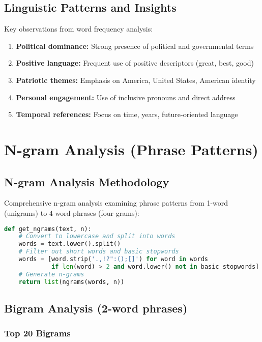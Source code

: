 \documentclass[12pt,a4paper]{article}
\begin{document}
\subsection{Linguistic Patterns and Insights}

Key observations from word frequency analysis:
\begin{enumerate}
\item \textbf{Political dominance:} Strong presence of political and governmental terms
\item \textbf{Positive language:} Frequent use of positive descriptors (great, best, good)
\item \textbf{Patriotic themes:} Emphasis on America, United States, American identity
\item \textbf{Personal engagement:} Use of inclusive pronouns and direct address
\item \textbf{Temporal references:} Focus on time, years, future-oriented language
\end{enumerate}

\section{N-gram Analysis (Phrase Patterns)}

\subsection{N-gram Analysis Methodology}

Comprehensive n-gram analysis examining phrase patterns from 1-word (unigrams) to 4-word phrases (four-grams):

\begin{lstlisting}[language=Python, caption=N-gram Generation Function]
def get_ngrams(text, n):
    # Convert to lowercase and split into words
    words = text.lower().split()
    # Filter out short words and basic stopwords
    words = [word.strip('.,!?":();[]') for word in words 
             if len(word) > 2 and word.lower() not in basic_stopwords]
    # Generate n-grams
    return list(ngrams(words, n))
\end{lstlisting}

\subsection{Bigram Analysis (2-word phrases)}

\subsubsection{Top 20 Bigrams}
\end{document}

